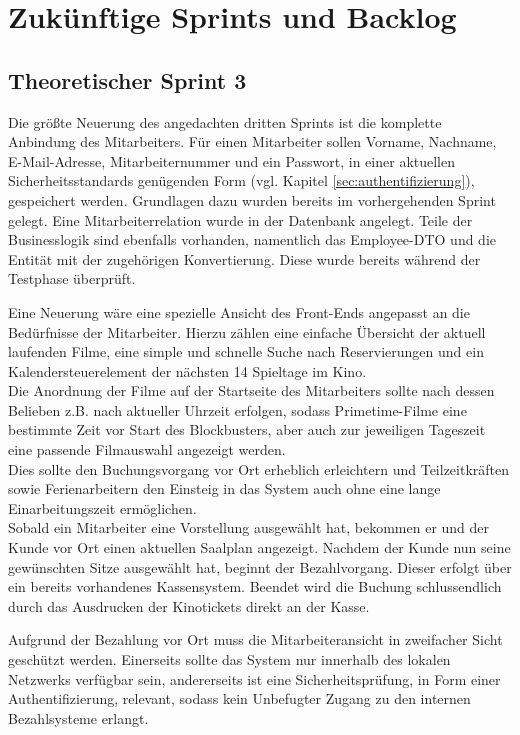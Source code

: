\section{Zukünftige Sprints und Backlog}

\subsection{Theoretischer Sprint 3}
\label{ssec:theoretischer_sprint}
\multipleauthorsection{\authorRF}{\authorEJ}
Die größte Neuerung des angedachten dritten Sprints ist die komplette Anbindung des Mitarbeiters.
Für einen Mitarbeiter sollen Vorname, Nachname, E-Mail-Adresse, Mitarbeiternummer und ein Passwort, in einer aktuellen Sicherheitsstandards genügenden Form (vgl. Kapitel \vref{sec:authentifizierung}), gespeichert werden.
Grundlagen dazu wurden bereits im vorhergehenden Sprint gelegt.
Eine Mitarbeiterrelation wurde in der Datenbank angelegt.
Teile der Businesslogik sind ebenfalls vorhanden, namentlich das Employee-\acs{DTO} und die Entität mit der zugehörigen Konvertierung.
Diese wurde bereits während der Testphase überprüft.

Eine Neuerung wäre eine spezielle Ansicht des Front-Ends angepasst an die Bedürfnisse der Mitarbeiter.
Hierzu zählen eine einfache Übersicht der aktuell laufenden Filme, eine simple und schnelle Suche nach Reservierungen und ein Kalendersteuerelement der nächsten 14 Spieltage im Kino. \\
Die Anordnung der Filme auf der Startseite des Mitarbeiters sollte nach dessen Belieben z.B. nach aktueller Uhrzeit erfolgen, sodass Primetime-Filme eine bestimmte Zeit vor Start des Blockbusters, aber auch zur jeweiligen Tageszeit eine passende Filmauswahl angezeigt werden. \\
Dies sollte den Buchungsvorgang vor Ort erheblich erleichtern und Teilzeitkräften sowie Ferienarbeitern den Einsteig in das System auch ohne eine lange Einarbeitungszeit ermöglichen. \\

Sobald ein Mitarbeiter eine Vorstellung ausgewählt hat, bekommen er und der Kunde vor Ort einen aktuellen Saalplan angezeigt.
Nachdem der Kunde nun seine gewünschten Sitze ausgewählt hat, beginnt der Bezahlvorgang.
Dieser erfolgt über ein bereits vorhandenes Kassensystem.
Beendet wird die Buchung schlussendlich durch das Ausdrucken der Kinotickets direkt an der Kasse.

Aufgrund der Bezahlung vor Ort muss die Mitarbeiteransicht in zweifacher Sicht geschützt werden.
Einerseits sollte das System nur innerhalb des lokalen Netzwerks verfügbar sein, andererseits ist eine Sicherheitsprüfung, in Form einer Authentifizierung, relevant, sodass kein Unbefugter Zugang zu den internen Bezahlsysteme erlangt.

